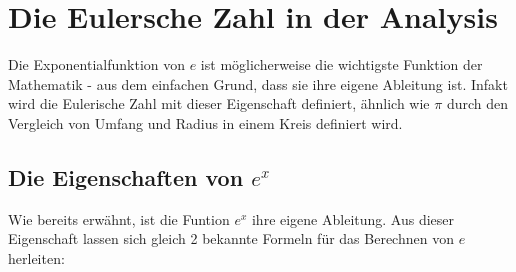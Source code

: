 \section{Die Eulersche Zahl in der Analysis} Die Exponentialfunktion von $e$ ist möglicherweise die wichtigste Funktion der Mathematik - aus dem einfachen Grund, dass sie ihre eigene Ableitung ist. Infakt wird die Eulerische Zahl mit dieser Eigenschaft definiert, ähnlich wie $\pi$ durch den Vergleich von Umfang und Radius in einem Kreis definiert wird.
\subsection{Die Eigenschaften von $e^x$}
Wie bereits erwähnt, ist die Funtion $e^x$ ihre eigene Ableitung. Aus dieser Eigenschaft lassen sich gleich 2 bekannte Formeln für das Berechnen von $e$ herleiten:
